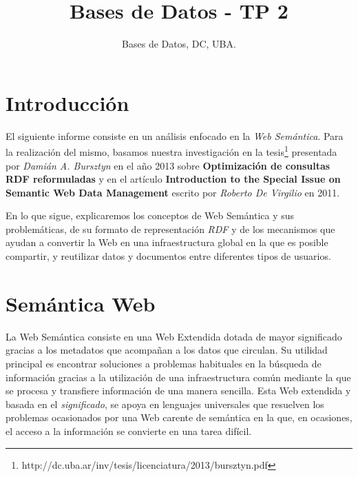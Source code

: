 \documentclass[10pt,a4paper]{article}
\title{Bases de Datos - TP 2}
\author{Bases de Datos, DC, UBA.}
\begin{document}



\maketitle

\tableofcontents

\newpage

\section{Introducción}

El siguiente informe consiste en un análisis enfocado en la \textit{Web Semántica}. Para la realización del mismo, basamos nuestra investigación en la tesis\footnote{http://dc.uba.ar/inv/tesis/licenciatura/2013/bursztyn.pdf} presentada por \textit{Damián A. Bursztyn} en el año 2013 sobre \textbf{Optimización de consultas RDF reformuladas} y en el artículo \textbf{Introduction to the Special Issue on Semantic Web Data Management} escrito por \textit{Roberto De Virgilio} en 2011.

En lo que sigue, explicaremos los conceptos de Web Semántica y sus problemáticas, de su formato de representación \textit{RDF} y de los mecanismos que ayudan a convertir la Web en una infraestructura global en la que es posible compartir, y reutilizar datos y documentos entre diferentes tipos de usuarios.

\newpage
\section{Semántica Web}
La Web Semántica consiste en una Web Extendida dotada de mayor significado gracias a los metadatos que acompañan a los datos que circulan. Su utilidad principal es encontrar soluciones a problemas habituales en la búsqueda de información gracias a la utilización de una infraestructura común mediante la que se procesa y transfiere información de una manera sencilla. Esta Web extendida y basada en el \textit{significado}, se apoya en lenguajes universales que resuelven los problemas ocasionados por una Web carente de semántica en la que, en ocasiones, el acceso a la información se convierte en una tarea difícil.
\end{document}
